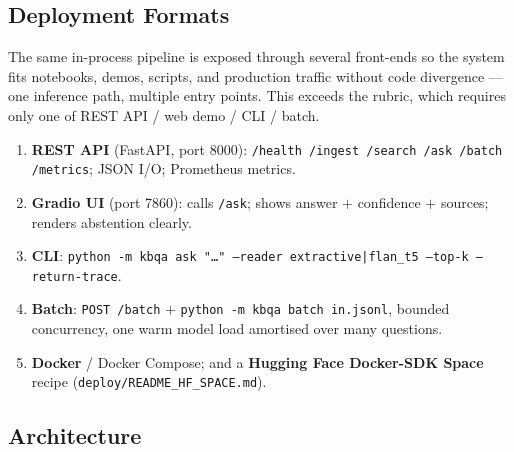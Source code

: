 \documentclass[12pt,a4paper]{article}
\begin{document}
\subsection{Deployment Formats}

The same in-process pipeline is exposed through several front-ends so the system fits notebooks, demos, scripts, and production traffic without code divergence --- one inference path, multiple entry points. This exceeds the rubric, which requires only one of REST API / web demo / CLI / batch.

\begin{enumerate}
  \item \textbf{REST API} (FastAPI, port 8000): \texttt{/health /ingest /search /ask /batch /metrics}; JSON I/O; Prometheus metrics.
  \item \textbf{Gradio UI} (port 7860): calls \texttt{/ask}; shows answer $+$ confidence $+$ sources; renders abstention clearly.
  \item \textbf{CLI}: \texttt{python -m kbqa ask "\dots" --reader extractive|flan\_t5 --top-k --return-trace}.
  \item \textbf{Batch}: \texttt{POST /batch} $+$ \texttt{python -m kbqa batch in.jsonl}, bounded concurrency, one warm model load amortised over many questions.
  \item \textbf{Docker} / Docker Compose; and a \textbf{Hugging Face Docker-SDK Space} recipe (\texttt{deploy/README\_HF\_SPACE.md}).
\end{enumerate}

\subsection{Architecture}
\end{document}
